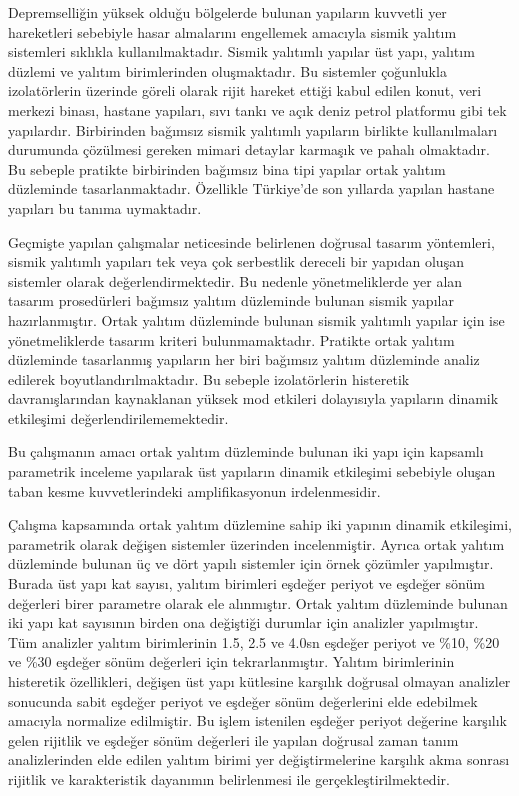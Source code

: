 Depremselliğin yüksek olduğu bölgelerde bulunan yapıların kuvvetli
yer hareketleri sebebiyle hasar almalarını engellemek amacıyla sismik
yalıtım sistemleri sıklıkla kullanılmaktadır. Sismik yalıtımlı yapılar
üst yapı, yalıtım düzlemi ve yalıtım birimlerinden oluşmaktadır. Bu
sistemler çoğunlukla izolatörlerin üzerinde göreli olarak rijit hareket
ettiği kabul edilen konut, veri merkezi binası, hastane yapıları,
sıvı tankı ve açık deniz petrol platformu gibi tek yapılardır. Birbirinden
bağımsız sismik yalıtımlı yapıların birlikte kullanılmaları durumunda
çözülmesi gereken mimari detaylar karmaşık ve pahalı olmaktadır. Bu
sebeple pratikte birbirinden bağımsız bina tipi yapılar ortak yalıtım
düzleminde tasarlanmaktadır. Özellikle Türkiye'de son yıllarda yapılan
hastane yapıları bu tanıma uymaktadır.

Geçmişte yapılan çalışmalar neticesinde belirlenen doğrusal tasarım
yöntemleri, sismik yalıtımlı yapıları tek veya çok serbestlik dereceli
bir yapıdan oluşan sistemler olarak değerlendirmektedir. Bu nedenle
yönetmeliklerde yer alan tasarım prosedürleri bağımsız yalıtım düzleminde
bulunan sismik yapılar hazırlanmıştır. Ortak yalıtım düzleminde bulunan
sismik yalıtımlı yapılar için ise yönetmeliklerde tasarım kriteri
bulunmamaktadır. Pratikte ortak yalıtım düzleminde tasarlanmış yapıların
her biri bağımsız yalıtım düzleminde analiz edilerek boyutlandırılmaktadır.
Bu sebeple izolatörlerin histeretik davranışlarından kaynaklanan yüksek
mod etkileri dolayısıyla yapıların dinamik etkileşimi değerlendirilememektedir.

Bu çalışmanın amacı ortak yalıtım düzleminde bulunan iki yapı için
kapsamlı parametrik inceleme yapılarak üst yapıların dinamik etkileşimi
sebebiyle oluşan taban kesme kuvvetlerindeki amplifikasyonun irdelenmesidir.

Çalışma kapsamında ortak yalıtım düzlemine sahip iki yapının dinamik
etkileşimi, parametrik olarak değişen sistemler üzerinden incelenmiştir.
Ayrıca ortak yalıtım düzleminde bulunan üç ve dört yapılı sistemler
için örnek çözümler yapılmıştır. Burada üst yapı kat sayısı, yalıtım
birimleri eşdeğer periyot ve eşdeğer sönüm değerleri birer parametre
olarak ele alınmıştır. Ortak yalıtım düzleminde bulunan iki yapı kat
sayısının birden ona değiştiği durumlar için analizler yapılmıştır.
Tüm analizler yalıtım birimlerinin 1.5, 2.5 ve 4.0sn eşdeğer periyot
ve \%10, \%20 ve \%30 eşdeğer sönüm değerleri için tekrarlanmıştır.
Yalıtım birimlerinin histeretik özellikleri, değişen üst yapı kütlesine
karşılık doğrusal olmayan analizler sonucunda sabit eşdeğer periyot
ve eşdeğer sönüm değerlerini elde edebilmek amacıyla normalize edilmiştir.
Bu işlem istenilen eşdeğer periyot değerine karşılık gelen rijitlik
ve eşdeğer sönüm değerleri ile yapılan doğrusal zaman tanım analizlerinden
elde edilen yalıtım birimi yer değiştirmelerine karşılık akma sonrası
rijitlik ve karakteristik dayanımın belirlenmesi ile gerçekleştirilmektedir.

